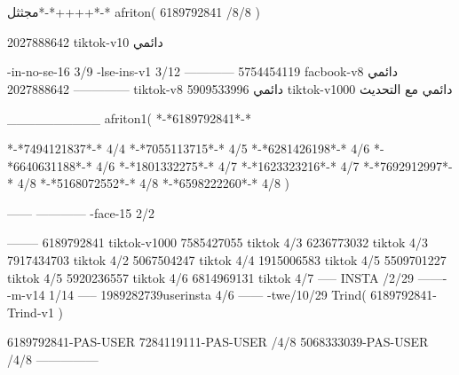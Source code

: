 مجثثل*-*++++*-*
afriton(
6189792841 /8/8
)

2027888642 tiktok-v10
دائمي

-in-no-se-16 3/9
-lse-ins-v1 3/12
------------
5754454119 facbook-v8
دائمي
--------------
2027888642 tiktok-v8
دائمي
5909533996 tiktok-v1000
دائمي مع التحديث

__________
afriton1(
*-*6189792841*-*

*-*7494121837*-* 4/4
*-*7055113715*-* 4/5
*-*6281426198*-* 4/6
*-*6640631188*-* 4/6
*-*1801332275*-* 4/7
*-*1623323216*-* 4/7
*-*7692912997*-* 4/8
*-*5168072552*-* 4/8
*-*6598222260*-* 4/8
)


------
------------
-face-15 2/2

--------
6189792841 tiktok-v1000
7585427055 tiktok 4/3
6236773032 tiktok 4/3
7917434703 tiktok 4/2
5067504247 tiktok 4/4
1915006583 tiktok 4/5
5509701227 tiktok 4/5
5920236557 tiktok 4/6
6814969131 tiktok 4/7
-----
 INSTA /2/29
-------
-m-v14 1/14
-----
1989282739userinsta 4/6
------
-twe/10/29
Trind(
6189792841-Trind-v1 
)

6189792841-PAS-USER
7284119111-PAS-USER /4/8
5068333039-PAS-USER /4/8
    ---------------
